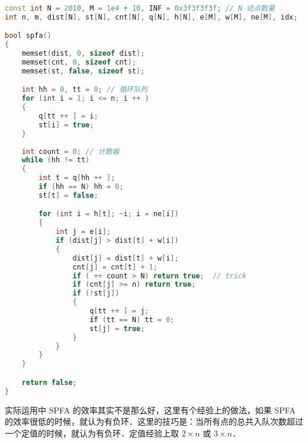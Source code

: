 \begin{lstlisting}[language=cpp]
const int N = 2010, M = 1e4 + 10, INF = 0x3f3f3f3f; // N 结点数量
int n, m, dist[N], st[N], cnt[N], q[N], h[N], e[M], w[M], ne[M], idx;

bool spfa()
{
    memset(dist, 0, sizeof dist);
    memset(cnt, 0, sizeof cnt);
    memset(st, false, sizeof st);

    int hh = 0, tt = 0; // 循环队列
    for (int i = 1; i <= n; i ++ )
    {
        q[tt ++ ] = i;
        st[i] = true;
    }
    
    int count = 0; // 计数器
    while (hh != tt)
    {
        int t = q[hh ++ ];
        if (hh == N) hh = 0;
        st[t] = false;

        for (int i = h[t]; ~i; i = ne[i])
        {
            int j = e[i];
            if (dist[j] > dist[t] + w[i])
            {
                dist[j] = dist[t] + w[i];
                cnt[j] = cnt[t] + 1;
                if ( ++ count > N) return true;  // trick
                if (cnt[j] >= n) return true;
                if (!st[j])
                {
                    q[tt ++ ] = j;
                    if (tt == N) tt = 0;    
                    st[j] = true;
                }
            }
        }
    }

    return false;
}
\end{lstlisting}

实际运用中 SPFA 的效率其实不是那么好，这里有个经验上的做法，如果 SPFA 的效率很低的时候，就认为有负环．这里的技巧是：当所有点的总共入队次数超过一个定值的时候，就认为有负环．定值经验上取 $2 \times n$ 或 $3 \times n$．